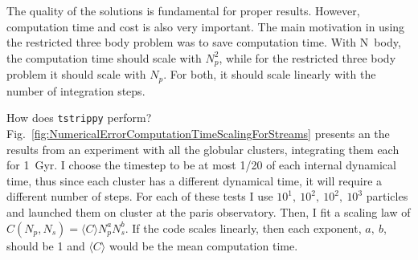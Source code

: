         The quality of the solutions is fundamental for proper results. However, computation time and cost is also very important. The main motivation in using the restricted three body problem was to save computation time. With N~body, the computation time should scale with $N_p^2$, while for the restricted three body problem it should scale with $N_p$. For both, it should scale linearly with the number of integration steps. 

        How does \texttt{tstrippy} perform? Fig.~\ref{fig:NumericalErrorComputationTimeScalingForStreams} presents an the results from an experiment with all the globular clusters, integrating them each for 1~Gyr. I choose the timestep to be at most 1/20 of each internal dynamical time, thus since each cluster has a different dynamical time, it will require a different number of steps. For each of these tests I use $10^1,~10^2,~10^2,~10^3$ particles and launched them on cluster at the paris observatory. Then, I fit a scaling law of $C(N_p,N_s) = \langle C\rangle N_p^a N_s^b$. If the code scales linearly, then each exponent, $a,~b$, should be 1 and $\langle C\rangle$ would be the mean computation time. 
        

